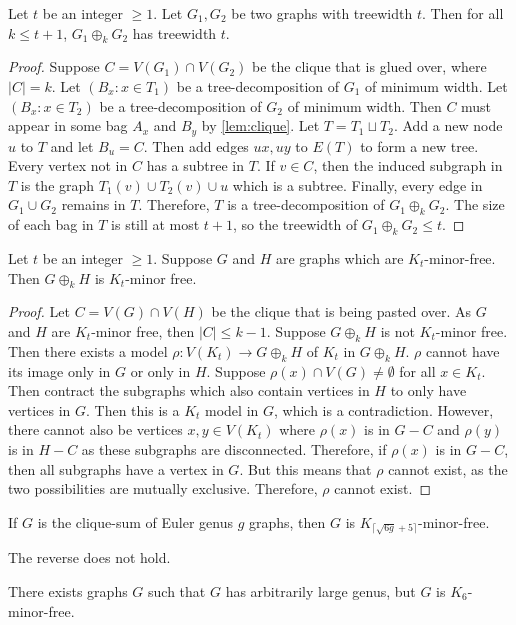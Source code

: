 \begin{lemma}
	Let $t$ be an integer $\geq 1$. Let $G_1, G_2$ be two graphs with treewidth $t$. Then for all $k \leq t + 1$, $G_1 \oplus_k G_2$ has treewidth $t$. 
\end{lemma}
\begin{proof}
	Suppose $C = V(G_1) \cap V(G_2)$ be the clique that is glued over, where $|C| = k$. Let $(B_x: x \in T_1)$ be a tree-decomposition of $G_1$ of minimum width. Let $(B_x : x \in T_2)$ be a tree-decomposition of $G_2$ of minimum width. Then $C$ must appear in some bag $A_x$ and $B_y$ by \cref{lem:clique}. Let $T = T_1 \sqcup T_2$. Add a new node $u$ to $T$ and let $B_u = C$. Then add edges $ux, uy$ to $E(T)$ to form a new tree. Every vertex not in $C$ has a subtree in $T$. If $v \in C$, then the induced subgraph in $T$ is the graph $T_1(v) \cup T_2(v) \cup u$ which is a subtree. Finally, every edge in $G_1 \cup G_2$ remains in $T$. Therefore, $T$ is a tree-decomposition of $G_1 \oplus_k G_2$. The size of each bag in $T$ is still at most $t + 1$, so the treewidth of $G_1 \oplus_k G_2 \leq t$.
\end{proof}

\begin{lemma}
	Let $t$ be an integer $\geq 1$. Suppose $G$ and $H$ are graphs which are $K_t$-minor-free. Then $G \oplus_k H$ is $K_{t}$-minor free. 
\end{lemma}
\begin{proof}
	Let $C = V(G) \cap V(H)$ be the clique that is being pasted over. As $G$ and $H$ are $K_t$-minor free, then $|C| \leq k - 1$. Suppose $G \oplus_k H$ is not $K_t$-minor free. Then there exists a model $\rho: V(K_t) \rightarrow G\oplus_k H$ of $K_t$ in $G \oplus_k H$. $\rho$ cannot have its image only in $G$ or only in $H$. Suppose $\rho(x) \cap V(G) \neq \emptyset$ for all $x \in K_t$. Then contract the subgraphs which also contain vertices in $H$ to only have vertices in $G$. Then this is a $K_t$ model in $G$, which is a contradiction. However, there cannot also be vertices $x, y \in V(K_t)$ where $\rho(x)$ is in $G - C$ and $\rho(y)$ is in $H - C$ as these subgraphs are disconnected. Therefore, if $\rho(x)$ is in $G - C$, then all subgraphs have a vertex in $G$. But this means that $\rho$ cannot exist, as the two possibilities are mutually exclusive. Therefore, $\rho$ cannot exist. 
\end{proof}

\begin{corollary}\label{corr:clique_sum_genus}
	If \(G\) is the clique-sum of Euler genus \(g\) graphs, then \(G\) is \(K_{\lceil \sqrt{6g} + 5 \rceil}\)-minor-free.
\end{corollary}
The reverse does not hold. 
\begin{lemma}
	There exists graphs $G$ such that \(G\) has arbitrarily large genus, but $G$ is \(K_{6}\)-minor-free.
\end{lemma}

